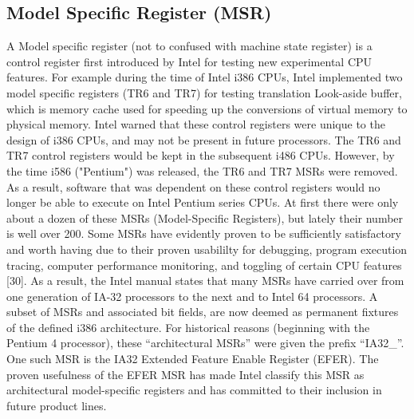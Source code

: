 \documentclass{report}
\begin{document}
\begin{spacing}{1.5}
\subsection{Model Specific Register (MSR)}

{\large
A Model specific register (not to confused with machine state register) is a control register first introduced by Intel for testing new experimental CPU features. For example during the time of Intel i386 CPUs, Intel implemented two model specific registers (TR6 and TR7) for testing translation Look-aside buffer, which is memory cache used for speeding up the conversions of virtual memory to physical memory. Intel warned that these control registers were unique to the design of i386 CPUs, and may not be present in future processors. The TR6 and TR7 control registers would be kept in the subsequent i486 CPUs. However, by the time i586 ("Pentium") was released, the TR6 and TR7 MSRs were removed. As a result, software that was dependent on these control registers would no longer be able to execute on Intel Pentium series CPUs. At first there were only about a dozen of these MSRs (Model-Specific Registers), but lately their number is well over 200. Some MSRs have evidently proven to be sufficiently satisfactory and worth having due to their proven usabililty for debugging, program execution tracing, computer performance monitoring, and toggling of certain CPU features [30]. As a result, the Intel manual states that many MSRs have carried over from one generation of IA-32 processors to the next and to Intel 64 processors. A subset of MSRs and associated bit fields, are now deemed as permanent fixtures of the defined i386 architecture. For historical reasons (beginning with the Pentium 4 processor), these “architectural MSRs” were given the prefix “IA32\_”. One such MSR is the IA32 Extended Feature Enable Register (EFER). The proven usefulness of the EFER MSR has made Intel classify this MSR as architectural model-specific registers and has committed to their inclusion in future product lines.
\newline
}


\end{spacing}
\end{document}
